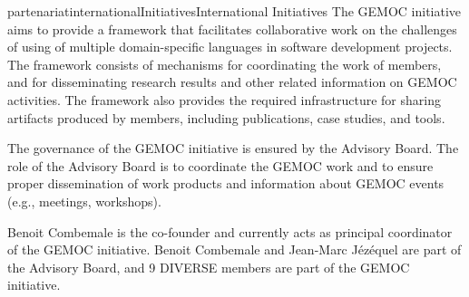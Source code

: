 \documentclass{ra2018}
\begin{document}
\begin{module}{partenariat}{internationalInitiatives}{International Initiatives}
The GEMOC initiative aims to provide a framework that facilitates collaborative work on the challenges of using of multiple domain-specific languages in software development projects. The framework consists of mechanisms for coordinating the work of members, and for disseminating research results and other related information on GEMOC activities. The framework also provides the required infrastructure for sharing artifacts produced by members, including publications, case studies, and tools.

The governance of the GEMOC initiative is ensured by the Advisory Board. The role of the Advisory Board is to coordinate the GEMOC work and to ensure proper dissemination of work products and information about GEMOC events (e.g., meetings, workshops).

Benoit Combemale is the co-founder and currently acts as principal coordinator of the GEMOC initiative. Benoit Combemale and Jean-Marc Jézéquel are part of the Advisory Board, and 9 DIVERSE members are part of the GEMOC initiative.


\end{module}
\end{document}
